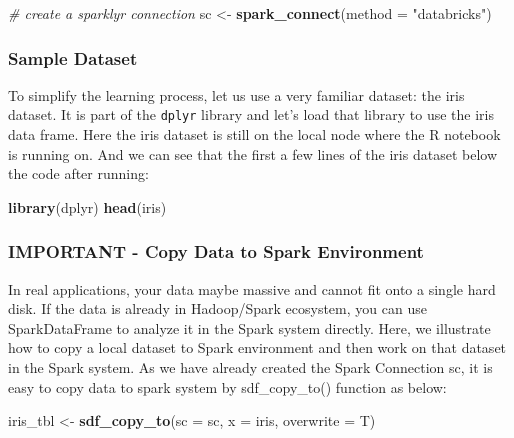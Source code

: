 \documentclass[
]{article}
\newenvironment{Shaded}{\begin{snugshade}}{\end{snugshade}}
\newcommand{\CommentTok}[1]{\textcolor[rgb]{0.56,0.35,0.01}{\textit{#1}}}
\newcommand{\DataTypeTok}[1]{\textcolor[rgb]{0.13,0.29,0.53}{#1}}
\newcommand{\KeywordTok}[1]{\textcolor[rgb]{0.13,0.29,0.53}{\textbf{#1}}}
\newcommand{\NormalTok}[1]{#1}
\newcommand{\StringTok}[1]{\textcolor[rgb]{0.31,0.60,0.02}{#1}}
\begin{document}
\begin{Shaded}
\begin{Highlighting}[]
\CommentTok{# create a sparklyr connection }
\NormalTok{sc <-}\StringTok{ }\KeywordTok{spark_connect}\NormalTok{(}\DataTypeTok{method =} \StringTok{"databricks"}\NormalTok{)}
\end{Highlighting}
\end{Shaded}

\hypertarget{sample-dataset}{%
\subsubsection{Sample Dataset}\label{sample-dataset}}

To simplify the learning process, let us use a very familiar dataset:
the iris dataset. It is part of the \texttt{dplyr} library and let's
load that library to use the iris data frame. Here the iris dataset is
still on the local node where the R notebook is running on. And we can
see that the first a few lines of the iris dataset below the code after
running:

\begin{Shaded}
\begin{Highlighting}[]
\KeywordTok{library}\NormalTok{(dplyr)}
\KeywordTok{head}\NormalTok{(iris)}
\end{Highlighting}
\end{Shaded}

\hypertarget{important---copy-data-to-spark-environment}{%
\subsubsection{IMPORTANT - Copy Data to Spark
Environment}\label{important---copy-data-to-spark-environment}}

In real applications, your data maybe massive and cannot fit onto a
single hard disk. If the data is already in Hadoop/Spark ecosystem, you
can use SparkDataFrame to analyze it in the Spark system directly. Here,
we illustrate how to copy a local dataset to Spark environment and then
work on that dataset in the Spark system. As we have already created the
Spark Connection sc, it is easy to copy data to spark system by
sdf\_copy\_to() function as below:

\begin{Shaded}
\begin{Highlighting}[]
\NormalTok{iris_tbl <-}\StringTok{ }\KeywordTok{sdf_copy_to}\NormalTok{(}\DataTypeTok{sc =}\NormalTok{ sc, }\DataTypeTok{x =}\NormalTok{ iris, }\DataTypeTok{overwrite =}\NormalTok{ T)}
\end{Highlighting}
\end{Shaded}
\end{document}
